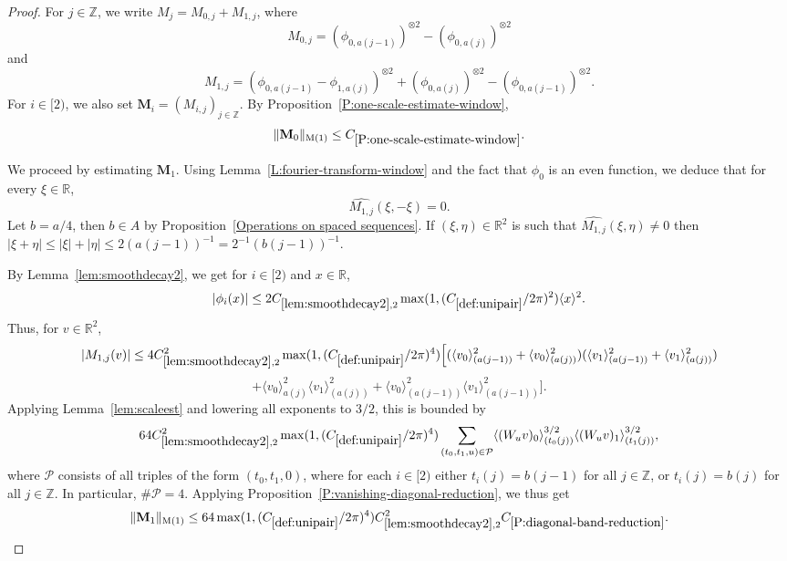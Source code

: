 \documentclass[12pt,reqno]{amsart}
\theoremstyle{plain}
\numberwithin{equation}{section}
\theoremstyle{remark}
\newcommand{\Z}{{\mathbb Z}}
\newcommand{\R}{{\mathbb R}}
\begin{document}
\begin{proof}
For $j\in \Z$, we write $M_j=M_{0,j}+M_{1,j}$, where
\[
M_{0,j}= ({\phi}_{0,a(j-1)})^{\otimes 2} -({\phi}_{0,a(j)})^{\otimes 2}
\]
and
\[
M_{1,j}=({\phi}_{0,a(j-1)}-{\phi}_{1,a(j)})^{\otimes 2} + ({\phi}_{0,a(j)})^{\otimes 2} -({\phi}_{0,a(j-1)})^{\otimes 2}.
\]
For $i\in [2)$, we also set $\mathbf{M}_i=(M_{i,j})_{j\in \Z}$. By Proposition~\ref{P:one-scale-estimate-window},
\[
\|\mathbf{M}_0\|_{\rm M(1)} \leq C_{\ref{P:one-scale-estimate-window}}.
\]

We proceed by estimating $\mathbf{M}_1$.
Using Lemma~\ref{L:fourier-transform-window} and the fact that $\phi_0$ is an even function, we deduce that for every $\xi \in \R$,
\[
\widehat{M_{1,j}}(\xi,-\xi)=0.
\]
Let $b=a/4$, then $b\in A$ by Proposition~\ref{Operations on spaced sequences}.
If $(\xi,\eta) \in \R^2$ is such that $\widehat{M_{1,j}}(\xi,\eta) \neq 0$ then $|\xi+\eta| \leq |\xi|+|\eta| \leq 2(a(j-1))^{-1}=2^{-1} (b(j-1))^{-1}$.

By Lemma~\ref{lem:smoothdecay2}, we get for $i\in [2)$ and $x\in \R$,
\[
|\phi_i(x)| \leq 2 C_{\ref{lem:smoothdecay2},2} \max(1,(C_{\ref{def:unipair}}/2\pi)^2) \langle x \rangle^2.
\]
Thus, for $v\in \R^2$,
\[
|M_{1,j}(v)|
\leq 4 C_{\ref{lem:smoothdecay2},2}^2 \max(1,(C_{\ref{def:unipair}}/2\pi)^4)\Big[
(\langle v_0 \rangle^2_{(a(j-1))}+\langle v_0 \rangle^2_{(a(j))})
(\langle v_1 \rangle^2_{(a(j-1))}+\langle v_1 \rangle^2_{(a(j))})
\]
\[
+\langle v_0 \rangle^2_{a(j)} \langle v_1 \rangle^2_{(a(j))}+\langle v_0 \rangle^2_{(a(j-1))} \langle v_1 \rangle^2_{(a(j-1))} \Big].
\]
Applying Lemma~\ref{lem:scaleest} and lowering all exponents to $3/2$, this is bounded by
\[
64 C_{\ref{lem:smoothdecay2},2}^2 \max(1,(C_{\ref{def:unipair}}/2\pi)^4)
\sum_{(t_0,t_1,u) \in \mathcal P} \langle (W_u v)_0 \rangle^{3/2}_{(t_0(j))} \langle (W_u v)_1 \rangle^{3/2}_{(t_1(j))},
\]
where $\mathcal P$ consists of all triples of the form $(t_0,t_1,0)$, where for each $i\in [2)$ either $t_i(j)=b(j-1)$ for all $j\in \Z$, or $t_i(j)=b(j)$ for all $j\in \Z$. In particular, $\# \mathcal P=4$. Applying Proposition~\ref{P:vanishing-diagonal-reduction}, we thus get
\[
\|\mathbf{M}_1\|_{\rm M(1)} \leq 64 \max(1,(C_{\ref{def:unipair}}/2\pi)^4) C_{\ref{lem:smoothdecay2},2}^2C_{\ref{P:diagonal-band-reduction}}.
\]
\end{proof}
\end{document}
